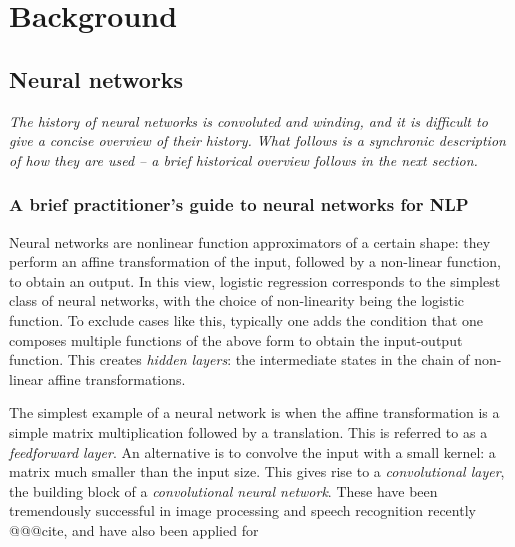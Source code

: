 
\chapter{Background}

\ifpdf
    \graphicspath{{Chapter2/Figs/Raster/}{Chapter2/Figs/PDF/}{Chapter2/Figs/}}
\else
    \graphicspath{{Chapter2/Figs/Vector/}{Chapter2/Figs/}}
\fi

\section{Neural networks}

\textit{The history of neural networks is convoluted and winding, and it is difficult to give a concise overview of their history. What follows is a synchronic description of how they are used -- a brief historical overview follows in the next section.}

\subsection{A brief practitioner's guide to neural networks for NLP}

Neural networks are nonlinear function approximators of a certain shape: they perform an affine transformation of the input, followed by a non-linear function, to obtain an output. In this view, logistic regression corresponds to the simplest class of neural networks, with the choice of non-linearity being the logistic function. To exclude cases like this, typically one adds the condition that one composes multiple functions of the above form to obtain the input-output function. This creates \textit{hidden layers}: the intermediate states in the chain of non-linear affine transformations.

The simplest example of a neural network is when the affine transformation is a simple matrix multiplication followed by a translation. This is referred to as a \textit{feedforward layer}. An alternative is to convolve the input with a small kernel: a matrix much smaller than the input size. This gives rise to a \textit{convolutional layer}, the building block of a \textit{convolutional neural network}. These have been tremendously successful in image processing and speech recognition recently @@@cite, and have also been applied for 


